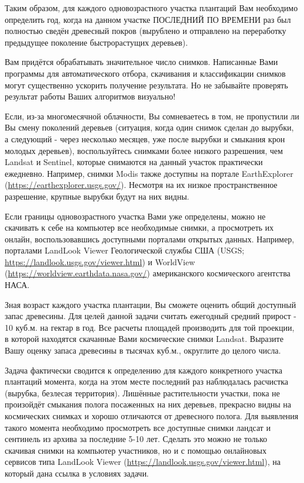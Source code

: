 Таким образом, для каждого одновозрастного участка плантаций Вам необходимо определить год, когда на данном участке ПОСЛЕДНИЙ ПО ВРЕМЕНИ раз был полностью сведён древесный покров (вырублено и отправлено на переработку предыдущее поколение быстрорастущих деревьев). 

Вам придётся обрабатывать значительное число снимков. Написанные Вами программы для автоматического отбора, скачивания и классификации снимков могут существенно ускорить получение результата. Но не забывайте проверять результат работы Ваших алгоритмов визуально!

Если, из-за многомесячной облачности, Вы сомневаетесь в том, не пропустили ли Вы смену поколений деревьев 
(ситуация, когда один снимок сделан до вырубки, а следующий - через несколько месяцев, уже после 
вырубки и смыкания крон молодых деревьев), воспользуйтесь снимками более низкого разрешения, чем Landsat и 
Sentinel, которые снимаются на данный участок практически ежедневно. Например, 
снимки Modis также доступны на портале EarthExplorer (\url{https://earthexplorer.usgs.gov/}). Несмотря на их низкое пространственное разрешение, крупные вырубки будут на них видны.

Если границы одновозрастного участка Вами уже определены, можно не скачивать к себе на компьютер все 
необходимые снимки, а просмотреть их онлайн, воспользовавшись доступными порталами открытых данных. 
Например, порталами LandLook Viewer Геологической службы США (USGS; \url{https://landlook.usgs.gov/viewer.html}) и WorldView (\url{https://worldview.earthdata.nasa.gov/}) американского космического агентства НАСА.

Зная возраст каждого участка плантации, Вы сможете оценить общий доступный запас древесины. Для целей данной задачи считать ежегодный средний прирост - 10 куб.м. на гектар в год. Все расчеты площадей производить для той проекции, в которой находятся скачанные Вами космические снимки Landsat. Выразите Вашу оценку запаса древесины в тысячах куб.м., округлите до целого числа.

\explanationSection

Задача фактически сводится к определению для каждого конкретного участка плантаций момента, когда на этом месте последний раз наблюдалась расчистка (вырубка, безлесая территория). Лишённые растительности участки, пока не произойдёт смыкания полога посаженных на них деревьев, прекрасно видны на космических снимках и хорошо отличаются от древесного полога. Для выявления такого момента необходимо просмотреть все доступные снимки ландсат и сентинель из архива за последние 5-10 лет. Сделать это можно не только скачивая снимки на компьютер участников, но и с помощью онлайновых сервисов типа LandLook Viewer (\url{https://landlook.usgs.gov/viewer.html}), на который дана ссылка в условиях задачи.


